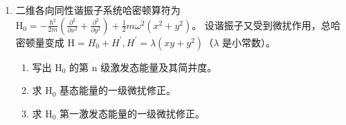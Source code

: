 \begin{enumerate}
\begin{enumerate}
	
	
\end{enumerate}


\item 
二维各向同性谐振子系统哈密顿算符为$\mathrm{H}_{0}=-\frac{\hbar^{2}}{2 m}\left(\frac{\partial^{2}}{\partial x^{2}}+\frac{\partial^{2}}{\partial y^{2}}\right)+\frac{1}{2} m \omega^{2}\left(x^{2}+y^{2}\right)$。
设谐振子又受到微扰作用，总哈密顿量变成 $\mathrm{H}=H_{0}+H^{\prime}, H^{\prime}=\lambda\left(x y+y^{2}\right) $（$\lambda$ 是小常数）。
\begin{enumerate}
	\item
写出 $\mathrm{H}_{0}$ 的第 $\mathrm{n}$ 级激发态能量及其简并度。
\item 
求 $\mathrm{H}_{0}$ 基态能量的一级微扰修正。

\item 
求 $\mathrm{H}_{0}$ 第一激发态能量的一级微扰修正。
	



\end{enumerate}
\end{enumerate}
